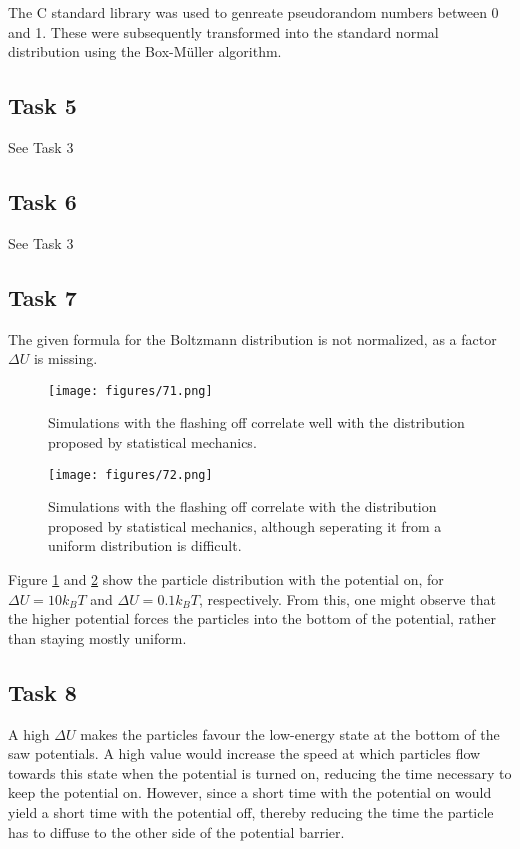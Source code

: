The C standard library was used to genreate pseudorandom numbers between 0 and 1.
These were subsequently transformed into the standard normal distribution
using the Box-Müller algorithm.

\subsection*{Task 5}

See Task 3

\subsection*{Task 6}

See Task 3

\subsection*{Task 7}

The given formula for the Boltzmann distribution is not normalized,
as a factor $\Delta U$ is missing. 

\begin{figure}
    \centering
    \texttt{[image: figures/71.png]}
    \caption{
        Simulations with the flashing off correlate well with the distribution
        proposed by statistical mechanics.
    }
    \label{fig:71}
\end{figure}

\begin{figure}
    \centering
    \texttt{[image: figures/72.png]}
    \caption{
        Simulations with the flashing off correlate with the distribution
        proposed by statistical mechanics, although seperating it from a 
        uniform distribution is difficult.
    }
    \label{fig:72}
\end{figure}

Figure \ref{fig:71} and \ref{fig:72} show the particle distribution with the potential on,
for $\Delta U = 10k_BT$ and $\Delta U = 0.1k_BT$, respectively. From this, one might observe
that the higher potential forces the particles into the bottom of the potential, 
rather than staying mostly uniform. 

\subsection*{Task 8}

A high $\Delta U$ makes the particles favour the low-energy state at the
bottom of the saw potentials. A high value would increase the speed at which
particles flow towards this state when the potential is turned on, 
reducing the time necessary to keep the potential on. 
However, since a short time with the potential on would yield 
a short time with the potential off, thereby reducing the time the particle 
has to diffuse to the other side of the potential barrier. 

